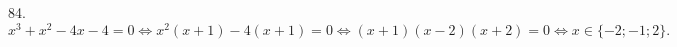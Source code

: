 84. $x^3+x^2-4x-4=0\Leftrightarrow x^2(x+1)-4(x+1)=0 \Leftrightarrow (x+1)(x-2)(x+2)=0 \Leftrightarrow x\in\{-2;-1;2\}.$\\

